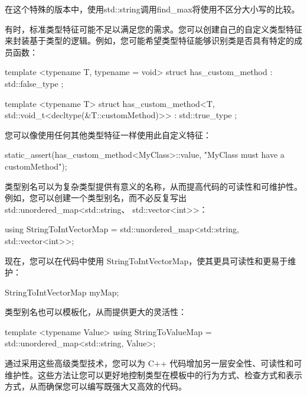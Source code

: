 在这个特殊的版本中，使用std::string调用find\_max将使用不区分大小写的比较。


有时，标准类型特征可能不足以满足您的需求。您可以创建自己的自定义类型特征来封装基于类型的逻辑。例如，您可能希望类型特征能够识别类是否具有特定的成员函数：

\begin{cpp}
template <typename T, typename = void>
struct has_custom_method : std::false_type {};

template <typename T>
struct has_custom_method<T, std::void_t<decltype(&T::customMethod)>> : std::true_type {};
\end{cpp}

您可以像使用任何其他类型特征一样使用此自定义特征：

\begin{cpp}
static_assert(has_custom_method<MyClass>::value, "MyClass must have a customMethod");
\end{cpp}


类型别名可以为复杂类型提供有意义的名称，从而提高代码的可读性和可维护性。例如，您可以创建一个类型别名，而不必反复写出 std::unordered\_map<std::string、 std::vector<int>{}>：

\begin{cpp}
using StringToIntVectorMap = std::unordered_map<std::string, std::vector<int>>;
\end{cpp}

现在，您可以在代码中使用 StringToIntVectorMap，使其更具可读性和更易于维护：

\begin{cpp}
StringToIntVectorMap myMap;
\end{cpp}

类型别名也可以模板化，从而提供更大的灵活性：

\begin{cpp}
template <typename Value>
using StringToValueMap = std::unordered_map<std::string, Value>;
\end{cpp}

通过采用这些高级类型技术，您可以为 C++ 代码增加另一层安全性、可读性和可维护性。这些方法让您可以更好地控制类型在模板中的行为方式、检查方式和表示方式，从而确保您可以编写既强大又高效的代码。










